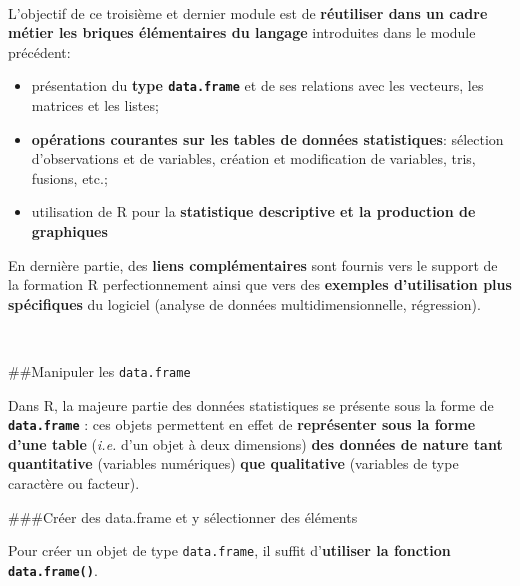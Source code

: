 \documentclass[12pt,twosided, notitlepage]{book}
\providecommand{\tightlist}{%
  \setlength{\itemsep}{0pt}\setlength{\parskip}{0pt}}
\begin{document}
~

L'objectif de ce troisième et dernier module est de \textbf{réutiliser
dans un cadre \og métier \fg{} les briques élémentaires du langage}
introduites dans le module précédent:

\begin{itemize}
\tightlist
\item
  présentation du \textbf{type \texttt{data.frame}} et de ses relations
  avec les vecteurs, les matrices et les listes;
\item
  \textbf{opérations courantes sur les tables de données statistiques}:
  sélection d'observations et de variables, création et modification de
  variables, tris, fusions, etc.;
\item
  utilisation de R pour la \textbf{statistique descriptive et la
  production de graphiques}
\end{itemize}

En dernière partie, des \textbf{liens complémentaires} sont fournis vers
le support de la formation R perfectionnement ainsi que vers des
\textbf{exemples d'utilisation plus spécifiques} du logiciel (analyse de
données multidimensionnelle, régression).

~

\#\#Manipuler les \texttt{data.frame}

Dans R, la majeure partie des données statistiques se présente sous la
forme de \textbf{\texttt{data.frame}} : ces objets permettent en effet
de \textbf{représenter sous la forme d'une table} (\emph{i.e.} d'un
objet à deux dimensions) \textbf{des données de nature tant
quantitative} (variables numériques) \textbf{que qualitative} (variables
de type caractère ou facteur).

\#\#\#Créer des data.frame et y sélectionner des éléments

Pour créer un objet de type \texttt{data.frame}, il suffit
d'\textbf{utiliser la fonction
\texttt{data.frame()}}.
\end{document}
